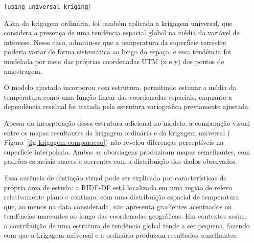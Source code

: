 \documentclass[
  letterpaper,
  DIV=11,
  numbers=noendperiod]{scrartcl}
\begin{document}
\begin{verbatim}
[using universal kriging]
\end{verbatim}

Além da krigagem ordinária, foi também aplicada a krigagem universal,
que considera a presença de uma tendência espacial global na média da
variável de interesse. Nesse caso, admitiu-se que a temperatura da
superfície terrestre poderia variar de forma sistemática ao longo do
espaço, e essa tendência foi modelada por meio das próprias coordenadas
UTM (x e y) dos pontos de amostragem.

O modelo ajustado incorporou essa estrutura, permitindo estimar a média
da temperatura como uma função linear das coordenadas espaciais,
enquanto a dependência residual foi tratada pela estrutura variográfica
previamente ajustada.

Apesar da incorporação dessa estrutura adicional no modelo, a comparação
visual entre os mapas resultantes da krigagem ordinária e da krigagem
universal ( Figura~\ref{fig-krigagem-comparacao}) não revelou diferenças
perceptíveis na superfície interpolada. Ambas as abordagens produziram
mapas semelhantes, com padrões espaciais suaves e coerentes com a
distribuição dos dados observados.

Essa ausência de distinção visual pode ser explicada por características
da própria área de estudo: a RIDE-DF está localizada em uma região de
relevo relativamente plano e contínuo, com uma distribuição espacial de
temperatura que, ao menos na data considerada, não apresenta gradientes
acentuados ou tendências marcantes ao longo das coordenadas geográficas.
Em contextos assim, a contribuição de uma estrutura de tendência global
tende a ser pequena, fazendo com que a krigagem universal e a ordinária
produzam resultados semelhantes.
\end{document}
